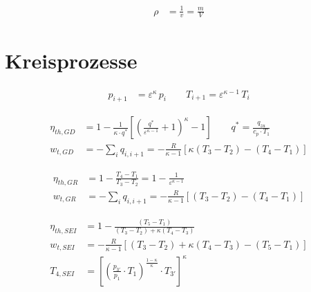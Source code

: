 \documentclass[english,threecolumn,color]{latex4ei/latex4ei_sheet}
\begin{document}
\begin{sectionbox}
	\begin{align*}
		\rho&=\frac{1}{v}=\frac{m}{V}
	\end{align*}
\end{sectionbox}


\section{Kreisprozesse}
\begin{sectionbox}
	\begin{align*}
		p_{i+1}&=\varepsilon^\kappa \, p_i \qquad T_{i+1}=\varepsilon^{\kappa-1}\,T_i
	\end{align*}
\end{sectionbox}
\begin{sectionbox}

	\begin{align*}
		\eta_{th,GD} &= 1- \frac{1}{\kappa \cdot q^{*}}\left[\left( \frac{q^{*}}{\varepsilon^{\kappa-1}} +1 \right)^\kappa -1 \right] \qquad q^{*}= \frac{q_{zu}}{c_p \cdot T_1}\\
			w_{t,GD} &=- \sum_{i} q_{i,i+1} = -\frac{R}{\kappa-1}\left[ \kappa\left(T_3 -T_2\right)-\left(T_4-T_1\right) \right]
	\end{align*}

\end{sectionbox}
\begin{sectionbox}
	\begin{align*}
		\eta_{th,GR} &= 1- \frac{T_4-T_1}{T_3-T_2} = 1- \frac{1}{\varepsilon^{\kappa-1}}\\
		w_{t,GR} &=- \sum_{i} q_{i,i+1} = -\frac{R}{\kappa-1}\left[ \left(T_3 -T_2\right)-\left(T_4-T_1\right) \right]
	\end{align*}
\end{sectionbox}

\begin{sectionbox}
	\begin{align*}
		\eta_{th,SEI}&= 1- \frac{\left(T_5-T_1\right)}{\left(T_3-T_2\right)+\kappa\left(T_4-T_3\right)}\\
		w_{t,SEI}&= -\frac{R}{\kappa-1}\left[\left(T_3 -T_2\right)+\kappa\left(T_4-T_3\right)-\left(T_5-T_1\right) \right]\\
		T_{4,SEI} &=\left[ \left( \frac{p_{3'}}{p_1} \cdot T_1\right)^{\frac{1-\kappa}{\kappa}} \cdot T_{3'}\right]^\kappa
	\end{align*}
\end{sectionbox}
\end{document}
